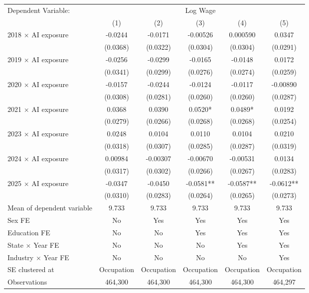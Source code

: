 \def\sym#1{\ifmmode^{#1}\else\(^{#1}\)\fi}
\begin{tabular}{l*{5}{c}}
\toprule
Dependent Variable: & \multicolumn{5}{c}{Log Wage} \\
\cmidrule(lr){2-6}
 & (1) & (2) & (3) & (4) & (5) \\
\midrule
2018 $\times$ AI exposure&     -0.0244   &     -0.0171   &    -0.00526   &    0.000590   &      0.0347   \\
            &    (0.0368)   &    (0.0322)   &    (0.0304)   &    (0.0304)   &    (0.0291)   \\
2019 $\times$ AI exposure&     -0.0256   &     -0.0299   &     -0.0165   &     -0.0148   &      0.0172   \\
            &    (0.0341)   &    (0.0299)   &    (0.0276)   &    (0.0274)   &    (0.0259)   \\
2020 $\times$ AI exposure&     -0.0157   &     -0.0244   &     -0.0124   &     -0.0117   &    -0.00890   \\
            &    (0.0308)   &    (0.0281)   &    (0.0260)   &    (0.0260)   &    (0.0287)   \\
2021 $\times$ AI exposure&      0.0368   &      0.0390   &      0.0520*  &      0.0489*  &      0.0192   \\
            &    (0.0279)   &    (0.0266)   &    (0.0268)   &    (0.0268)   &    (0.0254)   \\
2023 $\times$ AI exposure&      0.0248   &      0.0104   &      0.0110   &      0.0104   &      0.0210   \\
            &    (0.0318)   &    (0.0307)   &    (0.0285)   &    (0.0287)   &    (0.0319)   \\
2024 $\times$ AI exposure&     0.00984   &    -0.00307   &    -0.00670   &    -0.00531   &      0.0134   \\
            &    (0.0317)   &    (0.0302)   &    (0.0266)   &    (0.0267)   &    (0.0283)   \\
2025 $\times$ AI exposure&     -0.0347   &     -0.0450   &     -0.0581** &     -0.0587** &     -0.0612** \\
            &    (0.0310)   &    (0.0283)   &    (0.0264)   &    (0.0265)   &    (0.0273)   \\
\midrule
Mean of dependent variable&       9.733   &       9.733   &       9.733   &       9.733   &       9.733   \\
Sex FE      &          No   &         Yes   &         Yes   &         Yes   &         Yes   \\
Education FE&          No   &          No   &         Yes   &         Yes   &         Yes   \\
State $\times$ Year FE&          No   &          No   &          No   &         Yes   &         Yes   \\
Industry $\times$ Year FE&          No   &          No   &          No   &          No   &         Yes   \\
SE clustered at&  Occupation   &  Occupation   &  Occupation   &  Occupation   &  Occupation   \\
Observations&     464,300   &     464,300   &     464,300   &     464,300   &     464,297   \\
\bottomrule
\end{tabular}
